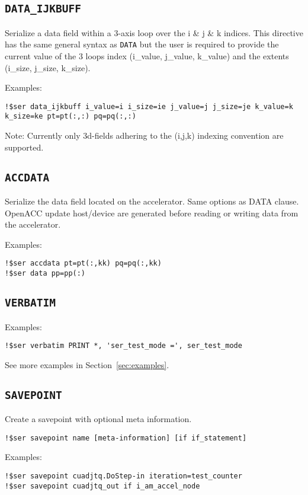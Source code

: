 \documentclass{article}
\begin{document}
\subsection{\texttt{DATA\_IJKBUFF}}
Serialize a data field within a 3-axis loop over the i & j & k indices. This directive has the same general syntax as \texttt{DATA} but the user is required to provide the current value of the 3 loops index (i\_value, j\_value, k\_value) and the extents (i\_size, j\_size, k\_size).

Examples:
\begin{lstlisting}
!$ser data_ijkbuff i_value=i i_size=ie j_value=j j_size=je k_value=k k_size=ke pt=pt(:,:) pq=pq(:,:)
\end{lstlisting}

Note: Currently only 3d-fields adhering to the (i,j,k) indexing convention are supported.

\subsection{\texttt{ACCDATA}}
Serialize the data field located on the accelerator. Same options as DATA clause.
OpenACC update host/device are generated before reading
or writing data from the accelerator.

Examples:
\begin{lstlisting}
!$ser accdata pt=pt(:,kk) pq=pq(:,kk)
!$ser data pp=pp(:)
\end{lstlisting}

\subsection{\texttt{VERBATIM}}
Examples:
\begin{lstlisting}
!$ser verbatim PRINT *, 'ser_test_mode =', ser_test_mode
\end{lstlisting}

See more examples in Section~\ref{sec:examples}.

\subsection{\texttt{SAVEPOINT}}
Create a savepoint with optional meta information.

\begin{lstlisting}
!$ser savepoint name [meta-information] [if if_statement]
\end{lstlisting}

Examples:
\begin{lstlisting}
!$ser savepoint cuadjtq.DoStep-in iteration=test_counter
!$ser savepoint cuadjtq_out if i_am_accel_node
\end{lstlisting}
\end{document}
